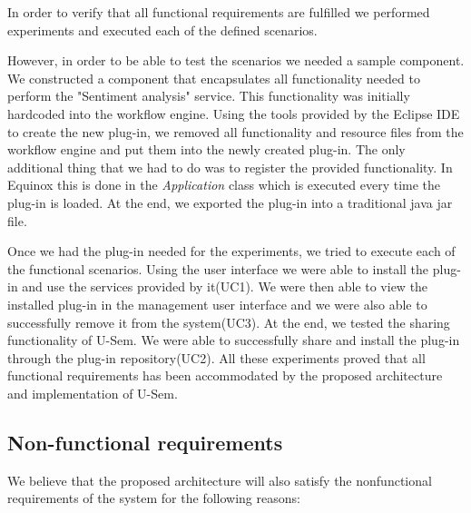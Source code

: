 In order to verify that all functional requirements are fulfilled we performed experiments and executed each of the defined scenarios.
 
However, in order to be able to test the scenarios we needed a sample component. We constructed a component that encapsulates all functionality needed to perform the "Sentiment analysis" service. This functionality was initially hardcoded into the workflow engine. Using the tools provided by the Eclipse IDE to create the new plug-in, we removed all functionality and resource files from the workflow engine and put them into the newly created plug-in. The only additional thing that we had to do was to register the provided functionality. In Equinox this is done in the \textit{Application} class which is executed every time the plug-in is loaded. At the end, we exported the plug-in into a traditional java jar file.

Once we had the plug-in needed for the experiments, we tried to execute each of the functional scenarios. Using the user interface we were able to install the plug-in and use the services provided by it(UC1). We were then able to view the installed plug-in in the management user interface and we were also able to successfully remove it from the system(UC3). At the end, we tested the sharing functionality of U-Sem. We were able to successfully share and install the plug-in through the plug-in repository(UC2). All these experiments proved that all functional requirements has been accommodated by the proposed architecture and implementation of U-Sem.


\subsection{Non-functional requirements}

We believe that the proposed architecture will also satisfy the nonfunctional requirements of the system for the following reasons:

